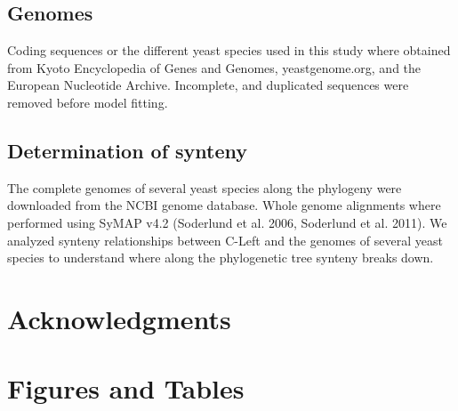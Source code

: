 \documentclass[12pt]{article}
\begin{document}
\subsection*{Genomes}
Coding sequences or the different yeast species used in this study where obtained from Kyoto Encyclopedia of Genes and Genomes, yeastgenome.org, and the European Nucleotide Archive. Incomplete, and duplicated sequences were removed before model fitting.

\subsection*{Determination of synteny}	
The complete genomes of several yeast species along the phylogeny were downloaded from the NCBI genome database.
Whole genome alignments where performed using SyMAP v4.2 (Soderlund et al. 2006, Soderlund et al. 2011).
We analyzed synteny relationships between C-Left and the genomes of several yeast species to understand where along the phylogenetic tree synteny breaks down.
  

\section*{Acknowledgments}






\section*{Figures and Tables}
\end{document}
